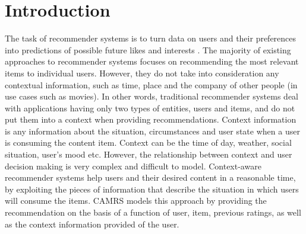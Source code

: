 \documentclass{article}
\begin{document}
 


\section{Introduction}
The task of recommender systems is to turn data on users and their preferences into predictions of possible future likes and interests \cite{adomavicius2011context}.  The majority of existing approaches to recommender systems focuses on recommending the most relevant items to individual users. However, they do not take into consideration any contextual information, such as time, place and the company of other people (in use cases such as movies). In other words, traditional recommender systems deal with applications having only two types of entities, users and items, and do not put them into a context when providing recommendations. 
Context information is any information about the situation, circumstances and user state when a user is consuming the content item. Context can be the time of day, weather, social situation, user’s mood etc.\cite{segaran2008programming} However, the relationship between context and user decision making is very complex and difficult to model. 
Context-aware recommender systems help users and their desired content in a reasonable time, by exploiting the pieces of information that describe the situation in which users will consume the items. CAMRS models this approach by providing the recommendation on the basis of a function of user, item, previous ratings, as well as the context information provided of the user.
\end{document}
